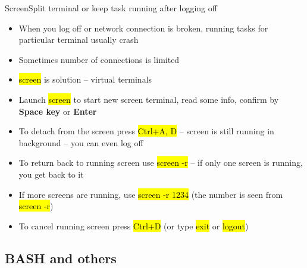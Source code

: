 \documentclass[compress, ucs, xelatex, 11pt, xcolor=svgnames,
  hyperref={
    bookmarks=true,
    unicode=true,
    colorlinks=true,
    pdftitle={Linux, command line and MetaCentrum},
    plainpages=false,
    pdfauthor={Vojtech Zeisek},
    pdfsubject={Course about use of Linux command line, writing shell scripts and using MetaCentrum of CESNET},
    pdfcreator={XeLaTeX},
    pdfkeywords={Linux, GNU, BASH, shell, command line, MetaCentrum},
    linkcolor=DarkRed,
    anchorcolor=DarkBlue,
    citecolor=Indigo,
    filecolor=NavyBlue,
    menucolor=DarkMagenta,
    urlcolor=DarkBlue,
    pdftex},
  url={hyphens, lowtilde} %
  ]{beamer}
\renewcommand{\texttt}[1]{\hl{\ttfamily #1}}
\begin{document}
\begin{frame}{Screen}{Split terminal or keep task running after logging off}
  \begin{itemize}
    \item When you log off or network connection is broken, running tasks for particular terminal usually crash
    \item Sometimes number of connections is limited
    \item \texttt{screen} is solution -- virtual terminals
    \item Launch \texttt{screen} to start new screen terminal, read some info, confirm by \textbf{Space key} or \textbf{Enter}
    \item To detach from the screen press \texttt{Ctrl+A, D} -- screen is still running in background -- you can even log off
    \item To return back to running screen use \texttt{screen -r} -- if only one screen is running, you get back to it
    \item If more screens are running, use \texttt{screen -r 1234} (the number is seen from \texttt{screen -r})
    \item To cancel running screen press \texttt{Ctrl+D} (or type \texttt{exit} or \texttt{logout})
  \end{itemize}
\end{frame}

\subsection{BASH and others}
\end{document}
